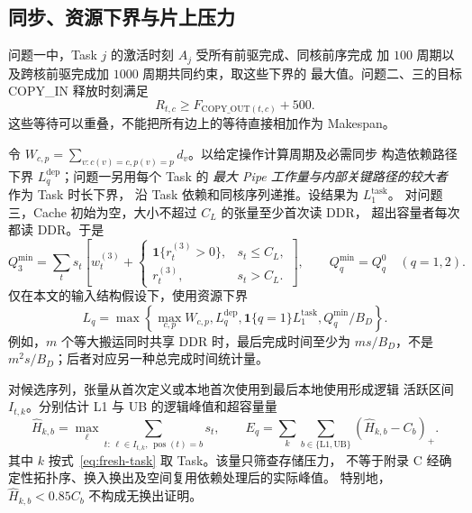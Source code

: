 \subsection{同步、资源下界与片上压力}
问题一中，Task $j$ 的激活时刻 $A_j$ 受所有前驱完成、同核前序完成
加 $100$ 周期以及跨核前驱完成加 $1000$ 周期共同约束，取这些下界的
最大值。问题二、三的目标 COPY\_IN 释放时刻满足
\begin{equation}
 R_{t,c}\ge F_{\mathrm{COPY\_OUT}(t,c)}+500.
\end{equation}
这些等待可以重叠，不能把所有边上的等待直接相加作为 Makespan。

令 $W_{c,p}=\sum_{v:c(v)=c,p(v)=p}d_v$。以给定操作计算周期及必需同步
构造依赖路径下界 $L_q^{\mathrm{dep}}$；问题一另用每个 Task 的
\emph{最大 Pipe 工作量与内部关键路径的较大者} 作为 Task 时长下界，
沿 Task 依赖和同核序列递推。设结果为 $L_1^{\mathrm{task}}$。
对问题三，Cache 初始为空，大小不超过 $C_L$ 的张量至少首次读 DDR，
超出容量者每次都读 DDR。于是
\begin{equation}
 Q_3^{\min}=\sum_t s_t\left[w_t^{(3)}+
 \begin{cases}\mathbf1\{r_t^{(3)}>0\},&s_t\le C_L,\\
 r_t^{(3)},&s_t>C_L.\end{cases}\right],\qquad
 Q_q^{\min}=Q_q^0\quad(q=1,2).
\end{equation}
仅在本文的输入结构假设下，使用资源下界
\begin{equation}
 L_q=\max\left\{\max_{c,p}W_{c,p},L_q^{\mathrm{dep}},
 \mathbf1\{q=1\}L_1^{\mathrm{task}},Q_q^{\min}/B_D\right\}.
 \label{eq:fresh-floor}
\end{equation}
例如，$m$ 个等大搬运同时共享 DDR 时，最后完成时间至少为
$ms/B_D$，不是 $m^2s/B_D$；后者对应另一种总完成时间统计量。

对候选序列，张量从首次定义或本地首次使用到最后本地使用形成逻辑
活跃区间 $I_{t,k}$。分别估计 L1 与 UB 的逻辑峰值和超容量量
\begin{equation}
 \widehat H_{k,b}=\max_\ell\sum_{t:\,\ell\in I_{t,k},\,\operatorname{pos}(t)=b}s_t,
 \qquad E_q=\sum_k\sum_{b\in\{\mathrm{L1},\mathrm{UB}\}}
       (\widehat H_{k,b}-C_b)_+.
 \label{eq:fresh-memory}
\end{equation}
其中 $k$ 按式~\eqref{eq:fresh-task} 取 Task。该量只筛查存储压力，
不等于附录 C 经确定性拓扑序、换入换出及空间复用依赖处理后的实际峰值。
特别地，$\widehat H_{k,b}<0.85C_b$ 不构成无换出证明。


